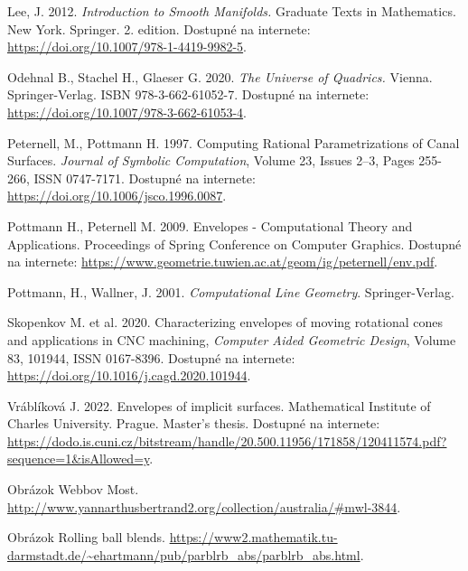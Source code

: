 \documentclass[12pt, twoside]{book}
\theoremstyle{definition}
\begin{document}
\begin{thebibliography}{99}
 Lee, J. 2012. \textit{Introduction to Smooth Manifolds.} Graduate Texts in Mathematics. New York. Springer. 2. edition. Dostupné na internete: \url{https://doi.org/10.1007/978-1-4419-9982-5}.

 Odehnal B., Stachel H., Glaeser G. 2020. \textit{The Universe of Quadrics.} Vienna. Springer-Verlag. ISBN 978-3-662-61052-7. Dostupné na internete: \url{https://doi.org/10.1007/978-3-662-61053-4}.

 Peternell, M., Pottmann H. 1997. Computing Rational Parametrizations of Canal Surfaces. \textit{Journal of Symbolic Computation}, Volume 23, Issues 2–3, Pages 255-266, ISSN 0747-7171. Dostupné na internete: \url{https://doi.org/10.1006/jsco.1996.0087}.

 Pottmann H., Peternell M. 2009. Envelopes - Computational Theory and Applications. Proceedings of Spring Conference on Computer Graphics. Dostupné na internete: \url{https://www.geometrie.tuwien.ac.at/geom/ig/peternell/env.pdf}.

 Pottmann, H., Wallner, J. 2001. \textit{Computational Line Geometry}. Springer-Verlag.

 Skopenkov M. et al. 2020. Characterizing envelopes of moving rotational cones and applications in CNC machining, \textit{Computer Aided Geometric Design}, Volume 83, 101944, ISSN 0167-8396. Dostupné na internete: \url{https://doi.org/10.1016/j.cagd.2020.101944}.

 Vráblíková J. 2022. Envelopes of implicit surfaces. Mathematical Institute of Charles University. Prague. Master's thesis. Dostupné na internete: \url{https://dodo.is.cuni.cz/bitstream/handle/20.500.11956/171858/120411574.pdf?sequence=1&isAllowed=y}.


 Obrázok Webbov Most. \url{http://www.yannarthusbertrand2.org/collection/australia/#mwl-3844}.

 Obrázok Rolling ball blends. \url{https://www2.mathematik.tu-darmstadt.de/~ehartmann/pub/parblrb_abs/parblrb_abs.html}.




\end{thebibliography}
\end{document}
